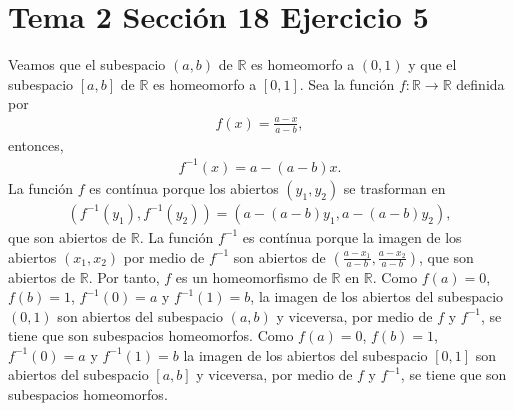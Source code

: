 \documentclass{article}
\begin{document}
\section{Tema 2 Sección 18 Ejercicio 5}
Veamos que el subespacio $(a,b)$ de $\mathbb{R}$ es homeomorfo a $(0,1)$ y que el subespacio $[a,b]$ de $\mathbb{R}$ es homeomorfo a $[0,1]$. Sea la función $f:\mathbb{R}\rightarrow \mathbb{R}$ definida por
\begin{eqnarray}
f(x)=\frac{a-x}{a-b}\nonumber ,
\end{eqnarray}
entonces,
\begin{eqnarray}
f^{-1}(x)=a-(a-b)x\nonumber.
\end{eqnarray}
La función $f$ es contínua porque los abiertos $(y_1,y_2)$ se trasforman en 
\begin{eqnarray}
(f^{-1}(y_1),f^{-1}(y_2))=(a-(a-b)y_1,a-(a-b)y_2),\nonumber
\end{eqnarray}
 que son abiertos de $\mathbb{R}$. La función $f^{-1}$ es contínua porque la imagen de los abiertos $(x_1,x_2)$ por medio de $f^{-1}$ son abiertos de  $(\frac{a-x_1}{a-b},\frac{a-x_2}{a-b})$, que son abiertos de $\mathbb{R}$. Por tanto, $f$ es un homeomorfismo de $\mathbb{R}$ en $\mathbb{R}$. Como $f(a)=0$, $f(b)=1$, $f^{-1}(0)=a$ y $f^{-1}(1)=b$, la imagen de los abiertos del subespacio $(0,1)$ son abiertos del subespacio $(a,b)$ y viceversa, por medio de $f$ y $f^{-1}$, se tiene que son subespacios homeomorfos. Como $f(a)=0$, $f(b)=1$, $f^{-1}(0)=a$ y $f^{-1}(1)=b$ la imagen de los abiertos del subespacio $[0,1]$ son abiertos del subespacio $[a,b]$ y viceversa, por medio de $f$ y $f^{-1}$, se tiene que son subespacios homeomorfos.
\end{document}
